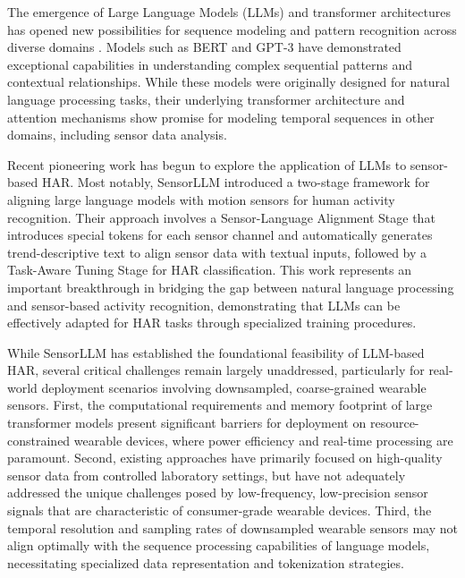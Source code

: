 The emergence of Large Language Models (LLMs) and transformer architectures has opened new possibilities for sequence modeling and pattern recognition across diverse domains \cite{Vaswani2017Attention}. Models such as BERT \cite{Devlin2019BERT} and GPT-3 \cite{Brown2020GPT3} have demonstrated exceptional capabilities in understanding complex sequential patterns and contextual relationships. While these models were originally designed for natural language processing tasks, their underlying transformer architecture and attention mechanisms show promise for modeling temporal sequences in other domains, including sensor data analysis.

Recent pioneering work has begun to explore the application of LLMs to sensor-based HAR. Most notably, SensorLLM \cite{li2024sensorllm} introduced a two-stage framework for aligning large language models with motion sensors for human activity recognition. Their approach involves a Sensor-Language Alignment Stage that introduces special tokens for each sensor channel and automatically generates trend-descriptive text to align sensor data with textual inputs, followed by a Task-Aware Tuning Stage for HAR classification. This work represents an important breakthrough in bridging the gap between natural language processing and sensor-based activity recognition, demonstrating that LLMs can be effectively adapted for HAR tasks through specialized training procedures.

While SensorLLM has established the foundational feasibility of LLM-based HAR, several critical challenges remain largely unaddressed, particularly for real-world deployment scenarios involving downsampled, coarse-grained wearable sensors. First, the computational requirements and memory footprint of large transformer models present significant barriers for deployment on resource-constrained wearable devices, where power efficiency and real-time processing are paramount. Second, existing approaches have primarily focused on high-quality sensor data from controlled laboratory settings, but have not adequately addressed the unique challenges posed by low-frequency, low-precision sensor signals that are characteristic of consumer-grade wearable devices. Third, the temporal resolution and sampling rates of downsampled wearable sensors may not align optimally with the sequence processing capabilities of language models, necessitating specialized data representation and tokenization strategies.

